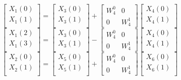 \documentclass[journal,12pt,twocolumn]{IEEEtran}
\renewcommand\thesection{\arabic{section}}
\begin{document}
\begin{enumerate}[label=\arabic*.,ref=\thesection.\theenumi]
\begin{equation}
\begin{bmatrix}
X_{1}(0) \\ 
X_{1}(1)\\ 
\end{bmatrix}
=
\begin{bmatrix}
X_{3}(0) \\ 
X_{3}(1)\\ 
\end{bmatrix}
+
\begin{bmatrix}
W^{0}_{4} & 0\\
0 & W^{1}_{4}
\end{bmatrix}
\begin{bmatrix}
X_{4}(0) \\ 
X_{4}(1) \\ 
\end{bmatrix}
\end{equation}
\begin{equation}
\begin{bmatrix}
X_{1}(2) \\ 
X_{1}(3)\\ 
\end{bmatrix}
=
\begin{bmatrix}
X_{3}(0) \\ 
X_{3}(1)\\ 
\end{bmatrix}
-
\begin{bmatrix}
W^{0}_{4} & 0\\
0 & W^{1}_{4}
\end{bmatrix}
\begin{bmatrix}
X_{4}(0) \\ 
X_{4}(1) \\ 
\end{bmatrix}
\end{equation}
\begin{equation}
\begin{bmatrix}
X_{2}(0) \\ 
X_{2}(1)\\ 
\end{bmatrix}
=
\begin{bmatrix}
X_{5}(0) \\ 
X_{5}(1)\\ 
\end{bmatrix}
+
\begin{bmatrix}
W^{0}_{4} & 0\\
0 & W^{1}_{4}
\end{bmatrix}
\begin{bmatrix}
X_{6}(0) \\ 
X_{6}(1) \\ 

\end{bmatrix}
\end{equation}
\end{enumerate}
\end{document}
